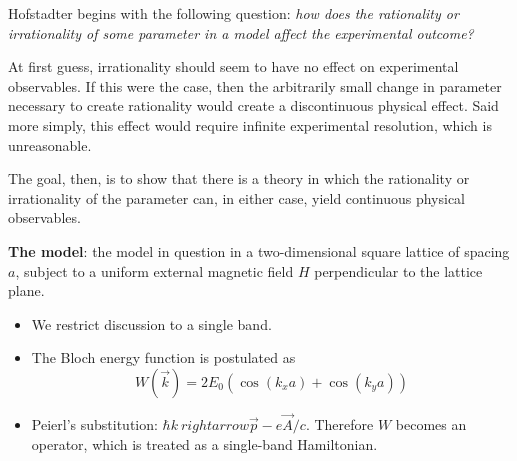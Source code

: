 \documentclass[10pt]{article}
\begin{document}
\maketitle

Hofstadter begins with the following question: \emph{how does the rationality or irrationality of
some parameter in a model affect the experimental outcome?}

At first guess, irrationality should seem to have no effect on experimental observables. If this were the case, then the arbitrarily small change in
parameter necessary to create rationality would create a discontinuous physical effect. Said more simply, this effect would require infinite experimental
resolution, which is unreasonable.

The goal, then, is to show that there is a theory in which the rationality or irrationality of the parameter can, in either case, yield continuous physical
observables.

\textbf{The model}: the model in question in a two-dimensional square lattice of spacing $a$, subject to a uniform external magnetic field $H$ perpendicular
to the lattice plane.
\begin{itemize}
  \item We restrict discussion to a single band.
  \item The Bloch energy function is postulated as
  $$W(\vec{k}) = 2E_{0}(\cos(k_{x}a) + \cos(k_{y}a))$$
  \item Peierl's substitution: $\hbar k \ rightarrow \vec{p} - e\vec{A}/c$. Therefore $W$ becomes an operator,
  which is treated as a single-band Hamiltonian. 
\end{itemize}
\end{document}

